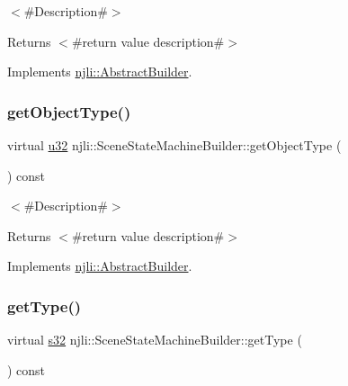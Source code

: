 $<$\#\+Description\#$>$

\begin{DoxyReturn}{Returns}
$<$\#return value description\#$>$ 
\end{DoxyReturn}


Implements \mbox{\hyperlink{classnjli_1_1_abstract_builder_a902f73ea78031b06aca183a417f3413b}{njli\+::\+Abstract\+Builder}}.

\mbox{\label{classnjli_1_1_scene_state_machine_builder_ae47cef2ded61a7fc61658ca3f9f92c50}} 
\subsubsection{\texorpdfstring{get\+Object\+Type()}{getObjectType()}}
{\footnotesize\ttfamily virtual \mbox{\hyperlink{_util_8h_a10e94b422ef0c20dcdec20d31a1f5049}{u32}} njli\+::\+Scene\+State\+Machine\+Builder\+::get\+Object\+Type (\begin{DoxyParamCaption}{ }\end{DoxyParamCaption}) const\hspace{0.3cm}{\ttfamily [virtual]}}

$<$\#\+Description\#$>$

\begin{DoxyReturn}{Returns}
$<$\#return value description\#$>$ 
\end{DoxyReturn}


Implements \mbox{\hyperlink{classnjli_1_1_abstract_builder_a0f2d344fcf697b167f4f2b1122b5fb33}{njli\+::\+Abstract\+Builder}}.

\mbox{\label{classnjli_1_1_scene_state_machine_builder_ae3bc10469ad482428a105f933b25b506}} 
\subsubsection{\texorpdfstring{get\+Type()}{getType()}}
{\footnotesize\ttfamily virtual \mbox{\hyperlink{_util_8h_aa62c75d314a0d1f37f79c4b73b2292e2}{s32}} njli\+::\+Scene\+State\+Machine\+Builder\+::get\+Type (\begin{DoxyParamCaption}{ }\end{DoxyParamCaption}) const\hspace{0.3cm}{\ttfamily [virtual]}}

